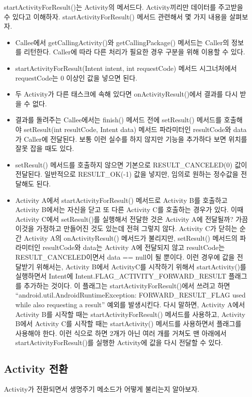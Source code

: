startActivityForResult()는 Activity의 메서드다. Activity끼리만 데이터를 주고받을 수 있다고 이해하자. 
startActivityForResult() 메서드 관련해서 몇 가지 내용을 살펴보자.
\begin{itemize} 
\item Callee에서 getCallingActivity()와 getCallingPackage() 메서드는 Caller의 정보를 리턴한다. Caller에 따라 다른 처리가 필요한 경우 구분을 위해 이용할 수 있다. 
\item startActivityForResult(Intent intent, int requestCode) 메서드 시그너처에서  requestCode는 0 이상인 값을 넣으면 된다.
\item 두 Activity가 다른 태스크에 속해 있다면 onActivityResult()에서 결과를 다시 받을 수 없다.
\item 결과를 돌려주는 Callee에서는 finish() 메서드 전에 setResult() 메서드를 호출해야 setResult(int resultCode, Intent data) 메서드 파라미터인 resultCode와 data가 Caller에 전달된다. 보통 이런 실수를 하지 않지만 기능을 추가하다 보면 위치를 잘못 잡을 때도 있다.
\item setResult() 메서드를 호출하지 않으면 기본으로 RESULT\_CANCELED(0) 값이 전달된다. 일반적으로 RESULT\_OK(-1) 값을 넣지만, 임의로 원하는 정수값을 전달해도 된다.
\item Activity A에서 startActivityForResult() 메서드로 Activity B를 호출하고 Activity B에서는 자신을 닫고 또 다른 Activity C를 호출하는 경우가 있다. 
이때 Activity C에서 setResult()를 실행해서 전달한 것은 Activity A에 전달될까? 가끔 이것을 가정하고 만들어진 것도 있는데 전혀 그렇지 않다. 
Activity C가 닫히는 순간 Activity A의 onActivityResult() 메서드가 불리지만, setResult() 메서드의 파라미터인 resultCode와 data는 Activity A에 전달되지 않고 resultCode는 RESULT\_CANCELED이면서 data == null이 될 뿐이다.  이런 경우에 값을 전달받기 위해서는, Activity B에서 ActivityC를 시작하기 위해서 startActivity()를 실행하면서 Intent에 Intent.FLAG\_ACTIVITY\_FORWARD\_RESULT 플래그를 추가하는 것이다.
이 플래그는 startActivityForResult()에서 쓰려고 하면 ``android.util.AndroidRuntimeExce\-ption: FORWARD\_RESULT\_F\-LAG used while also requesting a result''  예외를 발생시킨다. 
다시 말하면, Activity A에서 Activity B를 시작할 때는 startActivityForResult() 메서드를 사용하고, Activity B에서 Activity C를 시작할 때는 startActivity() 메서드를 사용하면서 플래그를 사용해야 한다. 
이런 식으로 하면 2개가 아닌 여러 개를 거쳐도 맨 아래에서 startActivityForResult()를 실행한 Activity에 값을 다시 전달할 수 있다.
\end{itemize}

\subsection{Activity 전환}
Activity가 전환되면서 생명주기 메소드가 어떻게 불리는지 알아보자.\\

